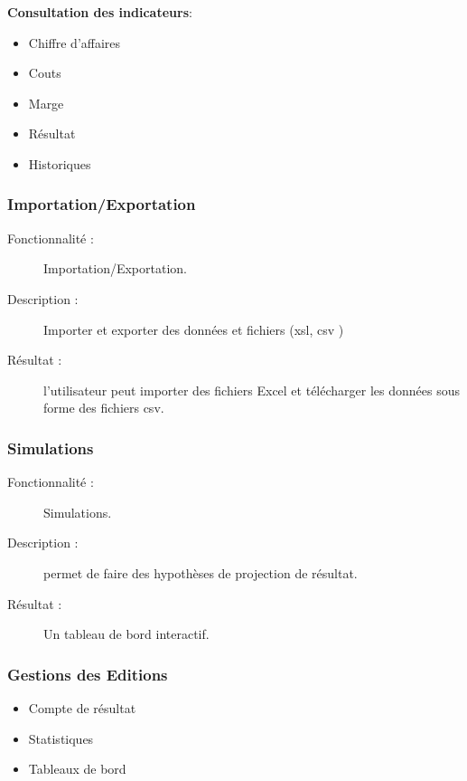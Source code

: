 \documentclass[12pt]{article}
\begin{document}
\textbf{Consultation des indicateurs}:
\begin{itemize}
\item  Chiffre d’affaires
\item Couts
\item Marge
\item Résultat
\item Historiques
\end{itemize}


\subsubsection{ Importation/Exportation}
\begin{description}

\item[Fonctionnalité :] Importation/Exportation.

\item[Description :]  Importer et exporter des données et fichiers (xsl, csv )

\item[Résultat :]  l'utilisateur peut importer des fichiers Excel et télécharger les données sous forme
 des  fichiers csv.
\end{description}

\subsubsection{ Simulations }
\begin{description}

\item[Fonctionnalité :] Simulations.

\item[Description :]  permet de faire des hypothèses de projection de résultat.

\item[Résultat :]  Un tableau de bord interactif.
\end{description}

\subsubsection{Gestions des Editions}
\begin{itemize}

\item Compte de résultat 
 
\item Statistiques

\item Tableaux de bord
\end{itemize}
\end{document}
